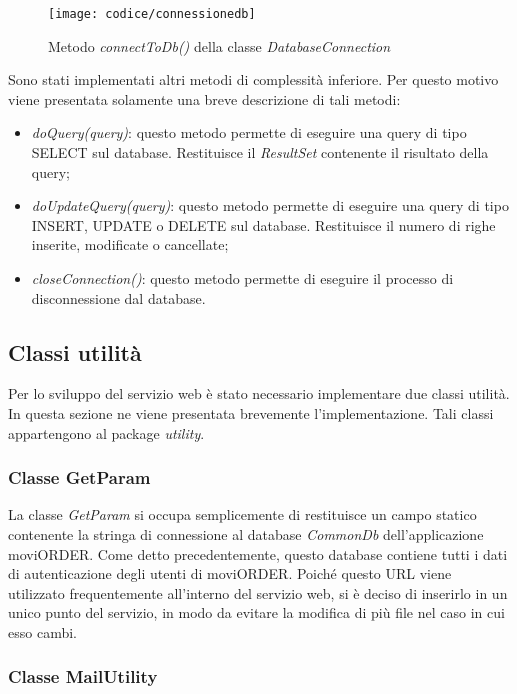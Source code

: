 \begin{figure}[!h] 
    \centering 
    \texttt{[image: codice/connessionedb]} 
    \caption{Metodo \textit{connectToDb()} della classe \textit{DatabaseConnection}}
\end{figure}


Sono stati implementati altri metodi di complessità inferiore. Per questo motivo viene presentata solamente una breve descrizione di tali metodi:
\begin{itemize}
	\item \textit{doQuery(query)}: questo metodo permette di eseguire una query di tipo SELECT sul database. Restituisce il \textit{ResultSet} contenente il risultato della query;
	\item \textit{doUpdateQuery(query)}: questo metodo permette di eseguire una query di tipo INSERT, UPDATE o DELETE sul database. Restituisce il numero di righe inserite, modificate o cancellate;
	\item \textit{closeConnection()}: questo metodo permette di eseguire il processo di disconnessione dal database.
\end{itemize}

\subsection{Classi utilità}

Per lo sviluppo del servizio web è stato necessario implementare due classi utilità. In questa sezione ne viene presentata brevemente l'implementazione. Tali classi appartengono al package \textit{utility}.

\subsubsection{Classe GetParam}

La classe \textit{GetParam} si occupa semplicemente di restituisce un campo statico contenente la stringa di connessione al database \textit{CommonDb} dell'applicazione moviORDER. Come detto precedentemente, questo database contiene tutti i dati di autenticazione degli utenti di moviORDER. Poiché questo URL viene utilizzato frequentemente all'interno del servizio web, si è deciso di inserirlo in un unico punto del servizio, in modo da evitare la modifica di più file nel caso in cui esso cambi.

\subsubsection{Classe MailUtility}

